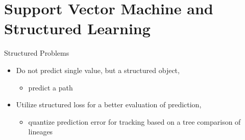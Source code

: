 \section{Support Vector Machine and Structured Learning}

\begin{frame}{Structured Problems}
    \begin{itemize}
          \item Do not predict single value, but a structured object,
        \begin{itemize}
              \item[] \eg predict a path
        \end{itemize}
          \item Utilize structured loss for a better evaluation of prediction, 
        \begin{itemize}
              \item[] \eg quantize prediction error for tracking based on a tree comparison of lineages
        \end{itemize}
    \end{itemize}
\end{frame}


